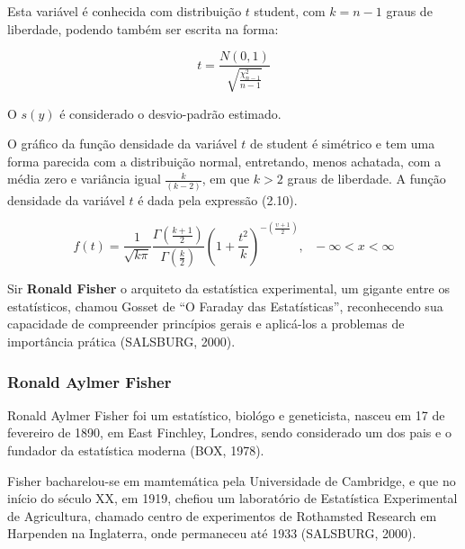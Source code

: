 Esta variável é conhecida com distribuição $t$ student, com $k=n-1$ graus de liberdade, podendo também ser escrita na forma:

\begin{equation}
    t =\frac{N(0,1)}{\sqrt{\frac{\chi^{2}_{n-1}}{n-1}}}
\end{equation}

O $s(y)$ é considerado o desvio-padrão estimado.\vskip0.3cm

O gráfico da função densidade da variável $t$ de student é simétrico e tem uma forma parecida com a distribuição normal, entretando, menos achatada, com a média zero e variância igual $\frac{k}{(k-2)}$, em que $k>2$ graus de liberdade. A função densidade da variável $t$ é dada pela expressão (2.10). 

\begin{equation}
f\left(t\right)=\frac{1}{\sqrt{k \pi}}\frac{\Gamma\left(\frac{k+1}{2}\right) }{\Gamma \left(\frac{k}{2}\right)}\left(1+\frac{t^2}{k}\right)^{-\left(\frac{\upsilon+1}{2}\right)},~~~-\infty<x<\infty
\end{equation}

Sir \textbf{Ronald Fisher} o arquiteto da estatística experimental, um gigante entre os estatísticos, chamou Gosset de “O Faraday das Estatísticas”, reconhecendo sua capacidade de compreender princípios gerais e aplicá-los a problemas de importância prática (SALSBURG, 2000).


\subsubsection{Ronald Aylmer Fisher}

Ronald Aylmer Fisher foi um estatístico, biológo e geneticista, nasceu em 17 de fevereiro de 1890, em East Finchley, Londres, sendo considerado um dos pais e o fundador da estatística moderna (BOX, 1978).\vskip0.3cm


Fisher bacharelou-se em mamtemática pela Universidade de Cambridge, e que no início do século XX, em 1919, chefiou um laboratório de Estatística Experimental de Agricultura, chamado centro de experimentos de Rothamsted Research em Harpenden na Inglaterra, onde permaneceu até 1933 (SALSBURG, 2000).

\vspace{-1.2cm}

